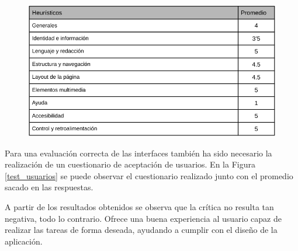 \documentclass[pdftex,11pt,a4paper]{book}
\begin{document}
\begin{figure}[h]
\begin{center}
\includegraphics[width=\textwidth]{img/heuristico13}
\caption{\label{heuristico13}}
\end{center}
\end{figure}

Para una evaluación correcta de las interfaces también ha sido necesario la realización de un cuestionario de aceptación de usuarios. En la Figura \ref{test_usuarios} se puede observar el cuestionario realizado junto con el promedio sacado en las respuestas.

A partir de los resultados obtenidos se observa que la crítica no resulta tan negativa, todo lo contrario. Ofrece una buena experiencia al usuario capaz de realizar las tareas de forma deseada, ayudando a cumplir con el diseño de la aplicación.
\end{document}
